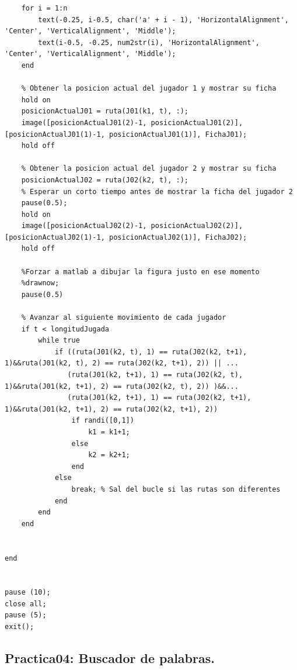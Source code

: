 \documentclass{article}
\begin{document}
\begin{lstlisting}[caption={Archivo: \textit{animacionP03} | Script}, style=matlabstyle, basicstyle=\ttfamily\footnotesize]
    % Colocar las Etiquetas de filas y columnas
    for i = 1:n
        text(-0.25, i-0.5, char('a' + i - 1), 'HorizontalAlignment', 'Center', 'VerticalAlignment', 'Middle');
        text(i-0.5, -0.25, num2str(i), 'HorizontalAlignment', 'Center', 'VerticalAlignment', 'Middle');
    end

    % Obtener la posicion actual del jugador 1 y mostrar su ficha
    hold on
    posicionActualJ01 = ruta(J01(k1, t), :);
    image([posicionActualJ01(2)-1, posicionActualJ01(2)], [posicionActualJ01(1)-1, posicionActualJ01(1)], FichaJ01);
    hold off

    % Obtener la posicion actual del jugador 2 y mostrar su ficha
    posicionActualJ02 = ruta(J02(k2, t), :);
    % Esperar un corto tiempo antes de mostrar la ficha del jugador 2
    pause(0.5);
    hold on
    image([posicionActualJ02(2)-1, posicionActualJ02(2)], [posicionActualJ02(1)-1, posicionActualJ02(1)], FichaJ02);
    hold off

    %Forzar a matlab a dibujar la figura justo en ese momento
    %drawnow;
    pause(0.5)

    % Avanzar al siguiente movimiento de cada jugador
    if t < longitudJugada
        while true
            if ((ruta(J01(k2, t), 1) == ruta(J02(k2, t+1), 1)&&ruta(J01(k2, t), 2) == ruta(J02(k2, t+1), 2)) || ...
               (ruta(J01(k2, t+1), 1) == ruta(J02(k2, t), 1)&&ruta(J01(k2, t+1), 2) == ruta(J02(k2, t), 2)) )&&...
               (ruta(J01(k2, t+1), 1) == ruta(J02(k2, t+1), 1)&&ruta(J01(k2, t+1), 2) == ruta(J02(k2, t+1), 2))
                if randi([0,1])
                    k1 = k1+1;
                else
                    k2 = k2+1;
                end
            else
                break; % Sal del bucle si las rutas son diferentes
            end
        end
    end


end


pause (10);
close all;
pause (5);
exit();
            \end{lstlisting}

    \subsection{Practica04: Buscador de palabras.}
\end{document}
